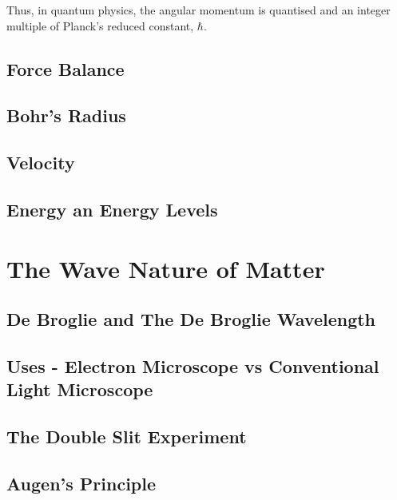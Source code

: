 \documentclass[colorlinks,11pt,a4paper,normalphoto,withhyper,ragged2e]{altareport}
\begin{document}
		\vspace{5mm}
		
		Thus, in quantum physics, the angular momentum is quantised and an integer multiple of Planck's reduced constant, $\hbar$. \linebreak
		
		
	\subsection{Force Balance}
		
		
	\subsection{Bohr’s Radius}
		
		
	\subsection{Velocity}
	
	
	\subsection{Energy an Energy Levels}
	
	
	\pagebreak
	
	
	
	
\section{The Wave Nature of Matter}
	
	\subsection{De Broglie and The De Broglie Wavelength}
	
	
	\subsection{Uses - Electron Microscope vs Conventional Light Microscope}
	
	
	\subsection{The Double Slit Experiment}
	
	
	\subsection{Augen’s Principle}
	
\end{document}
